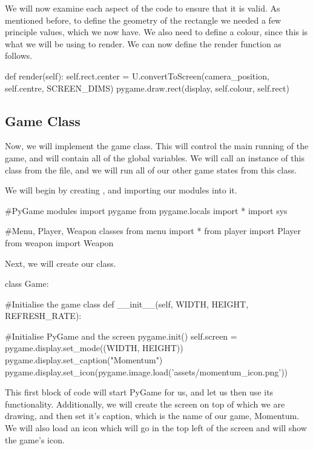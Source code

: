 We will now examine each aspect of the code to ensure that it is valid. As mentioned before, to define the geometry of the rectangle we needed a few principle values, which we now have. We also need to define a colour, since this is what we will be using to render. We can now define the render function as follows.

\begin{mpy}
    def render(self):
        self.rect.center = U.convertToScreen(camera_position, self.centre, SCREEN_DIMS)
        pygame.draw.rect(display, self.colour, self.rect)
\end{mpy}

\subsection{Game Class}
Now, we will implement the game class. This will control the main running of the game, and will contain all of the global variables. We will call an instance of this class from the  file, and we will run all of our other game states from this class.
\vs

We will begin by creating , and importing our modules into it.
\vs
\begin{mpy}
#PyGame modules
import pygame
from pygame.locals import *
import sys

#Menu, Player, Weapon classes
from menu import *
from player import Player
from weapon import Weapon
\end{mpy}
\vs
Next, we will create our  class.
\vs
\begin{mpy}
class Game:

    #Initialise the game class
    def __init__(self, WIDTH, HEIGHT, REFRESH_RATE):

        #Initialise PyGame and the screen
        pygame.init()
        self.screen = pygame.display.set_mode((WIDTH, HEIGHT))
        pygame.display.set_caption("Momentum")
        pygame.display.set_icon(pygame.image.load('assets/momentum_icon.png'))
\end{mpy}
\vs
This first block of code will start PyGame for us, and let us then use its functionality. Additionally, we will create the screen on top of which we are drawing, and then set it's caption, which is the name of our game, Momentum. We will also load an icon which will go in the top left of the screen and will show the game's icon.
\vs


